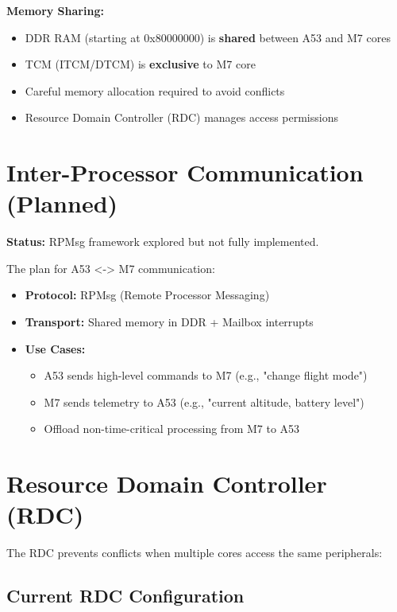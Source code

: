 \documentclass[12pt,a4paper]{report}
\begin{document}
\begin{important}
\textbf{Memory Sharing:}
\begin{itemize}
    \item DDR RAM (starting at 0x80000000) is \textbf{shared} between A53 and M7 cores
    \item TCM (ITCM/DTCM) is \textbf{exclusive} to M7 core
    \item Careful memory allocation required to avoid conflicts
    \item Resource Domain Controller (RDC) manages access permissions
\end{itemize}
\end{important}


\section{Inter-Processor Communication (Planned)}

\begin{important}
\textbf{Status:} RPMsg framework explored but not fully implemented.
\end{important}

The plan for A53 <-> M7 communication:
\begin{itemize}
    \item \textbf{Protocol:} RPMsg (Remote Processor Messaging)
    \item \textbf{Transport:} Shared memory in DDR + Mailbox interrupts
    \item \textbf{Use Cases:}
    \begin{itemize}
        \item A53 sends high-level commands to M7 (e.g., "change flight mode")
        \item M7 sends telemetry to A53 (e.g., "current altitude, battery level")
        \item Offload non-time-critical processing from M7 to A53
    \end{itemize}
\end{itemize}

\pagebreak

\section{Resource Domain Controller (RDC)}

The RDC prevents conflicts when multiple cores access the same peripherals:

\subsection{Current RDC Configuration}
\end{document}
